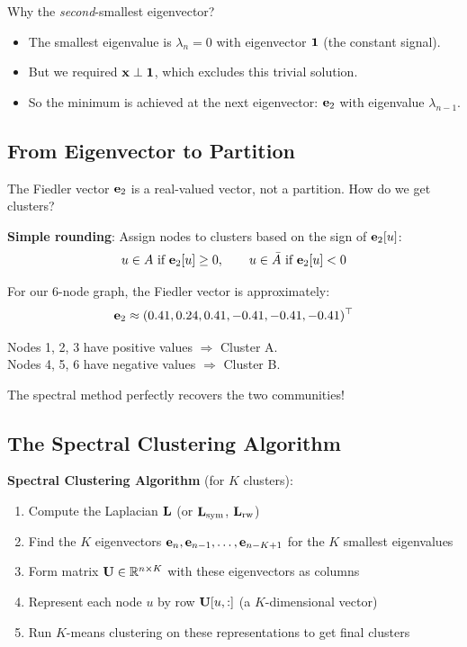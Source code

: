 \begin{notechapter}
\begin{intuition}
Why the \textit{second}-smallest eigenvector?
\begin{itemize}
    \item The smallest eigenvalue is $\lambda_n = 0$ with eigenvector $\mathbf{1}$ (the constant signal).
    \item But we required $\mathbf{x} \perp \mathbf{1}$, which excludes this trivial solution.
    \item So the minimum is achieved at the next eigenvector: $\mathbf{e}_2$ with eigenvalue $\lambda_{n-1}$.
\end{itemize}
\end{intuition}

\subsection{From Eigenvector to Partition}

The Fiedler vector $\mathbf{e}_2$ is a real-valued vector, not a partition. How do we get clusters?

\begin{keyidea}
\textbf{Simple rounding}: Assign nodes to clusters based on the sign of $\mathbf{e}_2[u]$:
\[
u \in A \text{ if } \mathbf{e}_2[u] \geq 0, \qquad u \in \bar{A} \text{ if } \mathbf{e}_2[u] < 0
\]
\end{keyidea}

\begin{example}
For our 6-node graph, the Fiedler vector is approximately:
\[
\mathbf{e}_2 \approx (0.41, 0.24, 0.41, -0.41, -0.41, -0.41)^\top
\]

Nodes 1, 2, 3 have positive values $\Rightarrow$ Cluster A.\\
Nodes 4, 5, 6 have negative values $\Rightarrow$ Cluster B.

The spectral method perfectly recovers the two communities!
\end{example}

\subsection{The Spectral Clustering Algorithm}

\begin{keyidea}
\textbf{Spectral Clustering Algorithm} (for $K$ clusters):
\begin{enumerate}
    \item Compute the Laplacian $\mathbf{L}$ (or $\mathbf{L}_{\text{sym}}$, $\mathbf{L}_{\text{rw}}$)
    \item Find the $K$ eigenvectors $\mathbf{e}_n, \mathbf{e}_{n-1}, \ldots, \mathbf{e}_{n-K+1}$ for the $K$ smallest eigenvalues
    \item Form matrix $\mathbf{U} \in \mathbb{R}^{n \times K}$ with these eigenvectors as columns
    \item Represent each node $u$ by row $\mathbf{U}[u, :]$ (a $K$-dimensional vector)
    \item Run $K$-means clustering on these representations to get final clusters
\end{enumerate}
\end{keyidea}


\end{notechapter}

